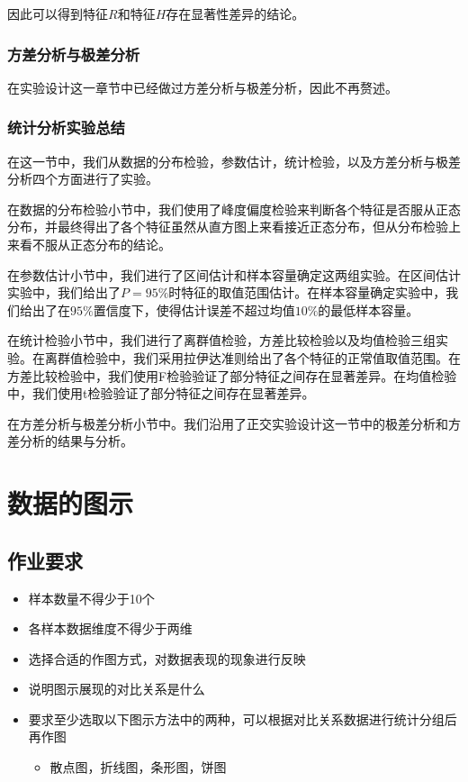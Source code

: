 \documentclass[UTF8]{ctexart}
\begin{document}
	因此可以得到特征$R$和特征$H$存在显著性差异的结论。
	
	\subsubsection{方差分析与极差分析}
	在实验设计这一章节中已经做过方差分析与极差分析，因此不再赘述。
	
	\subsubsection{统计分析实验总结}
	在这一节中，我们从数据的分布检验，参数估计，统计检验，以及方差分析与极差分析四个方面进行了实验。
	
	在数据的分布检验小节中，我们使用了峰度偏度检验来判断各个特征是否服从正态分布，并最终得出了各个特征虽然从直方图上来看接近正态分布，但从分布检验上来看不服从正态分布的结论。
	
	在参数估计小节中，我们进行了区间估计和样本容量确定这两组实验。在区间估计实验中，我们给出了$P=95\%$时特征的取值范围估计。在样本容量确定实验中，我们给出了在$95\%$置信度下，使得估计误差不超过均值$10\%$的最低样本容量。
	
	在统计检验小节中，我们进行了离群值检验，方差比较检验以及均值检验三组实验。在离群值检验中，我们采用拉伊达准则给出了各个特征的正常值取值范围。在方差比较检验中，我们使用F检验验证了部分特征之间存在显著差异。在均值检验中，我们使用t检验验证了部分特征之间存在显著差异。
	
	在方差分析与极差分析小节中。我们沿用了正交实验设计这一节中的极差分析和方差分析的结果与分析。
	
	\section{数据的图示}

	\subsection{作业要求}
	
	\begin{itemize}
		\item 样本数量不得少于10个
		\item 各样本数据维度不得少于两维
		\item 选择合适的作图方式，对数据表现的现象进行反映
		\item 说明图示展现的对比关系是什么
		\item 要求至少选取以下图示方法中的两种，可以根据对比关系数据进行统计分组后再作图
		\begin{itemize}
			\item 散点图，折线图，条形图，饼图
		\end{itemize} 
	\end{itemize} 
	
\end{document}
